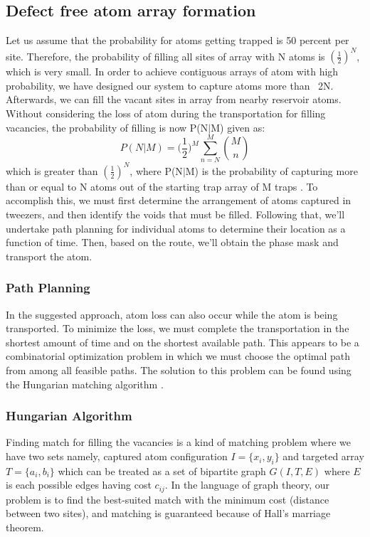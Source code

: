\subsection{Defect free atom array formation}
Let us assume that the probability for atoms getting trapped is 50 percent per site. Therefore, the probability of filling all sites of array with N atoms is $(\frac{1}{2})^N$, which is very small. In order to achieve contiguous arrays of atom with high probability, we have designed our system to capture atoms more than ~2N. Afterwards, we can fill the vacant sites in array from nearby reservoir atoms. Without considering the loss of atom during the transportation for filling vacancies, the probability of filling is now P(N$|$M) given as:
\begin{equation}
    P(N|M) = \Big(\frac{1}{2}\Big)^M \sum_{n=N}^M \binom{M}{n}
\end{equation}
which is greater than $(\frac{1}{2})^N$, where P(N$|$M) is the probability of capturing more than or equal to N atoms out of the starting trap array of M traps \cite{lee2017defect}. 
To accomplish this, we must first determine the arrangement of atoms captured in tweezers, and then identify the voids that must be filled. Following that, we'll undertake path planning for individual atoms to determine their location as a function of time. Then, based on the route, we'll obtain the phase mask and transport the atom.

\subsubsection{Path Planning}
In the suggested approach, atom loss can also occur while the atom is being transported. To minimize the loss, we must complete the transportation in the shortest amount of time and on the shortest available path. This appears to be a combinatorial optimization problem in which we must choose the optimal path from among all feasible paths. The solution to this problem can be found using the Hungarian matching algorithm \cite{lee2017defect}.

\subsubsection*{Hungarian Algorithm}
Finding match for filling the vacancies is a kind of matching problem where we have two sets namely, captured atom configuration $I = \{x_i, y_i\}$ and targeted array $T = \{a_i, b_i\}$ which can be treated as a set of bipartite graph $G(I, T, E)$ where $E$ is each possible edges having cost $c_{ij}$. In the language of graph theory, our problem is to find the best-suited match with the minimum cost (distance between two sites), and matching is guaranteed because of Hall's marriage theorem.

